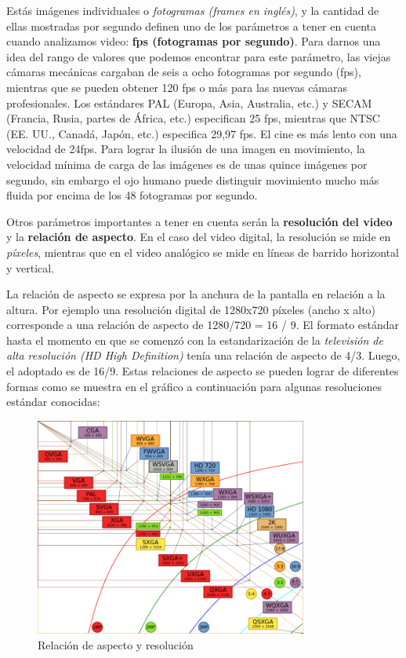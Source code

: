 \documentclass[12pt]{article}
\begin{document}
Estás imágenes individuales o {\it fotogramas (frames en inglés)}, y la 
cantidad de ellas mostradas por segundo definen uno de los parámetros a 
tener en cuenta cuando analizamos video: {\bf fps (fotogramas por segundo)}. 
Para darnos una idea del rango de valores que podemos encontrar para 
este parámetro, las viejas cámaras mecánicas cargaban de seis a ocho 
fotogramas por segundo (fps), mientras que se pueden obtener 120 fps o más para 
las nuevas cámaras profesionales. Los estándares PAL (Europa, Asia, Australia, 
etc.) y SECAM (Francia, Rusia, partes de África, etc.) especifican 25 fps, 
mientras que NTSC (EE. UU., Canadá, Japón, etc.) especifica 29,97 fps. El cine 
es más lento con una velocidad de 24fps. Para lograr la ilusión de una 
imagen en movimiento, la velocidad mínima de carga de las imágenes es de unas 
quince imágenes por segundo, sin embargo el ojo humano puede distinguir 
movimiento mucho más fluida por encima de los 48 fotogramas por segundo.

Otros parámetros importantes a tener en cuenta serán la {\bf resolución del video} y
la {\bf relación de aspecto}. En el caso del video digital, la resolución 
se mide en {\it píxeles}, mientras que en el video analógico se mide en 
líneas de barrido horizontal y vertical. 

La relación de aspecto se expresa por la anchura de la pantalla en relación a la altura. 
Por ejemplo una resolución digital de 1280x720 píxeles (ancho x alto) corresponde 
a una relación de aspecto de 1280/720 = 16 / 9. 
El formato estándar hasta el momento en que se comenzó con la estandarización de 
la {\it televisión de alta resolución (HD High Definition)} tenía una relación de 
aspecto de 4/3. Luego, el adoptado es de 16/9. Estas relaciones de aspecto se 
pueden lograr de diferentes formas como se muestra en el gráfico a continuación
para algunas resoluciones estándar conocidas:

\begin{figure}[h]
\centering
\includegraphics[width=0.8\textwidth]{resol.png}
\renewcommand{\figurename}{Fig.}
\caption{Relación de aspecto y resolución}
\label{contexto:figura}
\end{figure}
\end{document}
